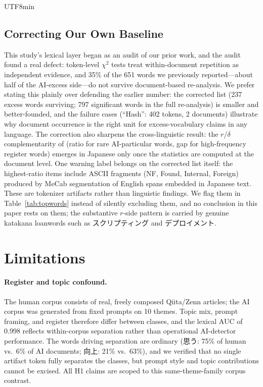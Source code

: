 \documentclass[11pt,a4paper]{article}
\begin{document}
\begin{CJK}{UTF8}{min}
\subsection{Correcting Our Own Baseline}

This study's lexical layer began as an audit of our prior work, and the audit found a real defect: token-level $\chi^2$ tests treat within-document repetition as independent evidence, and 35\% of the 651 words we previously reported---about half of the AI-excess side---do not survive document-based re-analysis. We prefer stating this plainly over defending the earlier number: the corrected list (237 excess words surviving; 797 significant words in the full re-analysis) is smaller and better-founded, and the failure cases (``Hash'': 402 tokens, 2 documents) illustrate why document occurrence is the right unit for excess-vocabulary claims in any language. The correction also sharpens the cross-linguistic result: the $r$/$\delta$ complementarity of \citet{kobak2025excess} (ratio for rare AI-particular words, gap for high-frequency register words) emerges in Japanese only once the statistics are computed at the document level. One warning label belongs on the corrected list itself: the highest-ratio items include ASCII fragments (NF, Found, Internal, Foreign) produced by MeCab segmentation of English spans embedded in Japanese text. These are tokenizer artifacts rather than linguistic findings. We flag them in Table~\ref{tab:topwords} instead of silently excluding them, and no conclusion in this paper rests on them; the substantive $r$-side pattern is carried by genuine katakana loanwords such as スクリプティング and デプロイメント.

\section{Limitations}
\label{sec:limitations}

\paragraph{Register and topic confound.} The human corpus consists of real, freely composed Qiita/Zenn articles; the AI corpus was generated from fixed prompts on 10 themes. Topic mix, prompt framing, and register therefore differ between classes, and the lexical AUC of 0.998 reflects within-corpus separation rather than operational AI-detector performance. The words driving separation are ordinary (思う: 75\% of human vs.\ 6\% of AI documents; 向上: 21\% vs.\ 63\%), and we verified that no single artifact token fully separates the classes, but prompt style and topic contributions cannot be excised. All H1 claims are scoped to this same-theme-family corpus contrast.


\end{CJK}
\end{document}
